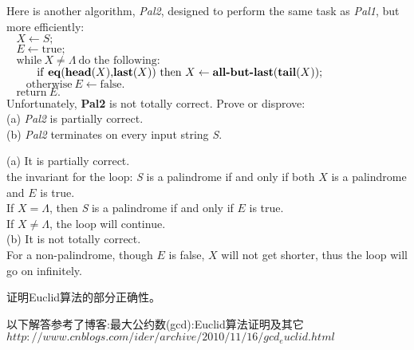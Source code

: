\documentclass[11pt, a4paper, UTF8]{ctexart}
\begin{document}
\begin{problem}[DH: 5.12]
  Here is another algorithm, \textsl{Pal2}, designed to perform the same task 
  as \textsl{Pal1}, but more efficiently:\\
  $~~~~X \gets S;$\\
  $~~~~E \gets \text{true};$\\
  $~~~~\text{while}~X \neq \Lambda~\text{do the following:}$\\
  $~~~~~~~~\text{if \textbf{eq}(\textbf{head}($X$),\textbf{last}($X$)) then}~
  X \gets \text{\textbf{all-but-last}(\textbf{tail}($X$))};$\\
  $~~~~~~~~\text{otherwise}~E \gets \text{false}.$\\
  $~~~~\text{return}~E.$\\
  Unfortunately, \textbf{Pal2} is not totally correct. Prove or disprove:\\
  (a) \textsl{Pal2} is partially correct.\\
  (b) \textsl{Pal2} terminates on every input string \textsl{S}.
\end{problem}

\begin{solution}
  (a) It is partially correct.\\
  the invariant for the loop: \textsl{S} is a palindrome if and only if both 
  $X$ is a palindrome and $E$ is true.\\
  If $X = \Lambda$, then \textsl{S} is a palindrome if and only if $E$ is true.\\
  If $X \neq \Lambda$, the loop will continue.\\
  (b) It is not totally correct.\\
  For a non-palindrome, though $E$ is false, $X$ will not get shorter, thus 
  the loop will go on infinitely.
\end{solution}

\begin{problem}
  证明Euclid算法的部分正确性。
\end{problem}

\begin{remark}
  以下解答参考了博客:最大公约数(gcd):Euclid算法证明及其它\\
  $http://www.cnblogs.com/ider/archive/2010/11/16/gcd_euclid.html$
\end{remark}
\end{document}
